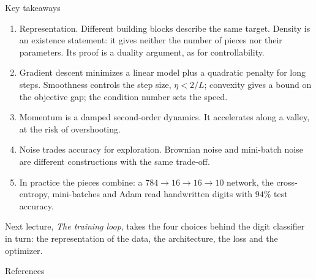 \documentclass[10pt]{beamer}
\begin{document}
\begin{frame}{Key takeaways}
\small
\begin{enumerate}
\item \alert{Representation.} Different building blocks describe the same target. Density is an existence statement: it gives neither the number of pieces nor their parameters. Its proof is a duality argument, as for controllability.
\item \alert{Gradient descent} minimizes a linear model plus a quadratic penalty for long steps. Smoothness controls the step size, $\eta<2/L$; convexity gives a bound on the objective gap; the condition number sets the speed.
\item \alert{Momentum} is a damped second-order dynamics. It accelerates along a valley, at the risk of overshooting.
\item \alert{Noise} trades accuracy for exploration. Brownian noise and mini-batch noise are different constructions with the same trade-off.
\item \alert{In practice} the pieces combine: a $784\to16\to16\to10$ network, the cross-entropy, mini-batches and Adam read handwritten digits with $94\%$ test accuracy.
\end{enumerate}

\medskip
\footnotesize
\alert{Next lecture}, \emph{The training loop}, takes the four choices behind the digit classifier in turn: the representation of the data, the architecture, the loss and the optimizer.
\end{frame}


\begin{frame}[allowframebreaks]{References}
\scriptsize


\end{frame}
\end{document}
